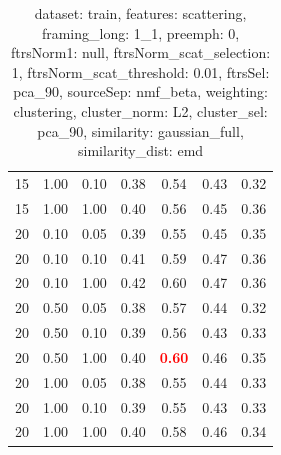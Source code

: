 \begin{table}
\begin{center}
\begin{tabular}{lllcccc}
15 & 1.00 & 0.10 & 0.38 & 0.54 & 0.43 & 0.32 \\ 
15 & 1.00 & 1.00 & 0.40 & 0.56 & 0.45 & 0.36 \\ 
20 & 0.10 & 0.05 & 0.39 & 0.55 & 0.45 & 0.35 \\ 
20 & 0.10 & 0.10 & 0.41 & 0.59 & 0.47 & 0.36 \\ 
20 & 0.10 & 1.00 & 0.42 & 0.60 & 0.47 & 0.36 \\ 
20 & 0.50 & 0.05 & 0.38 & 0.57 & 0.44 & 0.32 \\ 
20 & 0.50 & 0.10 & 0.39 & 0.56 & 0.43 & 0.33 \\ 
20 & 0.50 & 1.00 & 0.40 & \textbf{\textcolor{red}{0.60}} & 0.46 & 0.35 \\ 
20 & 1.00 & 0.05 & 0.38 & 0.55 & 0.44 & 0.33 \\ 
20 & 1.00 & 0.10 & 0.39 & 0.55 & 0.43 & 0.33 \\ 
20 & 1.00 & 1.00 & 0.40 & 0.58 & 0.46 & 0.34 \\ 
\end{tabular} 
\end{center} 
\caption{dataset: train, features: scattering, framing\_long: 1\_1, preemph: 0, ftrsNorm1: null, ftrsNorm\_scat\_selection: 1, ftrsNorm\_scat\_threshold: 0.01, ftrsSel: pca\_90, sourceSep: nmf\_beta, weighting: clustering, cluster\_norm: L2, cluster\_sel: pca\_90, similarity: gaussian\_full, similarity\_dist: emd} 
\label{datasetrFeaturscFraminlong1_1Preemp0Ftrsnorm1nuFtrsnoscatselect1Ftrsnoscatthresh0.01Ftrsselpc90SourcesepnmbeWeightclClustenormL2Clusteselpc90SimilagafuSimiladistem} 
\end{table} 
 
